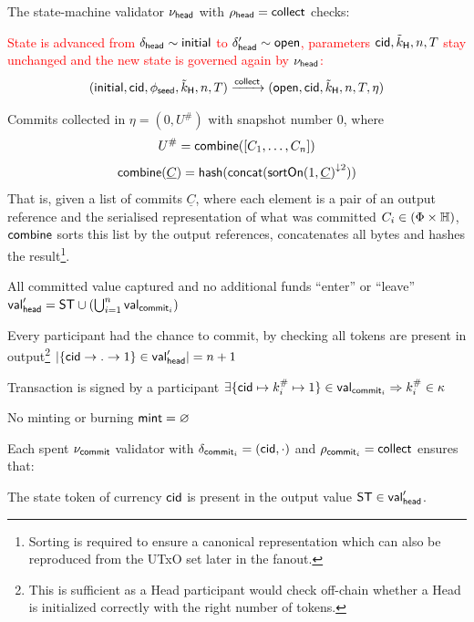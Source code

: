 \noindent The state-machine validator $\nu_\mathsf{head}$ with $\rho_{\mathsf{head}} = \mathsf{collect}$ checks:
\begin{menumerate}
	\item \textcolor{red}{State is advanced from $\delta_{\mathsf{head}} \sim \mathsf{initial}$ to $\delta_{\mathsf{head}}' \sim \mathsf{open}$, parameters $\mathsf{cid},\tilde{k}_{\mathsf{H}},n,T$ stay unchanged and the new state is governed again by $\nu_\mathsf{head}$:}
	\[
		(\mathsf{initial},\mathsf{cid},\phi_{\mathsf{seed}},\tilde{k}_{\mathsf{H}},n,T) \xrightarrow{\mathsf{collect}} (\mathsf{open},\mathsf{cid},\tilde{k}_{\mathsf{H}},n,T,\eta)
	\]
	\item Commits collected in $\eta = (0, U^{\#})$ with snapshot number $0$,
	where
	\[
		U^{\#} = \mathsf{combine}([C_{1}, \dots, C_{n}])
	\]
	\[
		\mathsf{combine}(\underline{C}) = \mathsf{hash}(\mathsf{concat}({\mathsf{sortOn}(1, \underline{C})}^{\downarrow2}))
	\]
	That is, given a list of commits $\underline{C}$, where each element is a
	pair of an output reference and the serialised representation of what was
	committed $C_{i} \in (\Phi \times \mathbb{H})$, $\mathsf{combine}$ sorts this
	list by the output references, concatenates all bytes and hashes the
	result\footnote{Sorting is required to ensure a canonical representation
		which can also be reproduced from the UTxO set later in the fanout.}.

	\item All committed value captured and no additional funds ``enter'' or ``leave''\\
	$\mathsf{val}_{\mathsf{head}}' = \mathsf{ST} \cup (\bigcup_{i=1}^{n} \mathsf{val}_{\mathsf{commit}_{i}})$
	\item Every participant had the chance to commit, by checking all tokens are
	present in output\footnote{This is sufficient as a Head participant would
		check off-chain whether a Head is initialized correctly with the right
		number of tokens.}
	$|\{\mathsf{cid} \rightarrow . \rightarrow 1\} \in \mathsf{val}_{\mathsf{head}}'| = n + 1$
	\item Transaction is signed by a participant $\exists \{\mathsf{cid} \mapsto k^{\#}_{i} \mapsto 1\} \in \mathsf{val}_{\mathsf{commit}_{i}} \Rightarrow k^{\#}_{i} \in \kappa$
	\item No minting or burning  $\mathsf{mint} = \varnothing$
\end{menumerate}

\noindent Each spent $\nu_{\mathsf{commit}}$ validator with $\delta_{\mathsf{commit}_{i}} = (\mathsf{cid},\cdot)$ and $\rho_{\mathsf{commit}_{i}} = \mathsf{collect}$ ensures that:
\begin{menumerate}
	\item The state token of currency $\mathsf{cid}$ is present in the output value
	$\mathsf{ST} \in \mathsf{val}_{\mathsf{head}}'$.
\end{menumerate}

